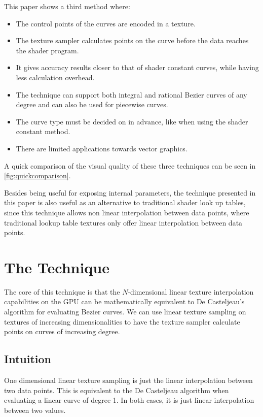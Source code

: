 \documentclass{jcgt}
\begin{document}
This paper shows a third method where:
\begin{itemize}
  \item The control points of the curves are encoded in a texture.
  \item The texture sampler calculates points on the curve before the data reaches the shader program.
  \item It gives accuracy results closer to that of shader constant curves, while having less calculation overhead.
  \item The technique can support both integral and rational Bezier curves of any degree and can also be used for piecewise curves.
  \item The curve type must be decided on in advance, like when using the shader constant method.
  \item There are limited applications towards vector graphics.
\end{itemize}

A quick comparison of the visual quality of these three techniques can be seen in \autoref{fig:quickcomparison}.

Besides being useful for exposing internal parameters, the technique presented in this paper is also useful as an alternative to traditional shader look up tables, since this technique allows non linear interpolation between data points, where traditional lookup table textures only offer linear interpolation between data points.

\section{The Technique}
\label{sec:thetechnique}

The core of this technique is that the $N$-dimensional linear texture interpolation capabilities on the GPU can be mathematically equivalent to De Casteljeau's algorithm for evaluating Bezier curves.  We can use linear texture sampling on textures of increasing dimensionalities to have the texture sampler calculate points on curves of increasing degree.

\subsection{Intuition}

One dimensional linear texture sampling is just the linear interpolation between two data points.  This is equivalent to the De Casteljeau algorithm when evaluating a linear curve of degree 1.  In both cases, it is just linear interpolation between two values.
\end{document}

